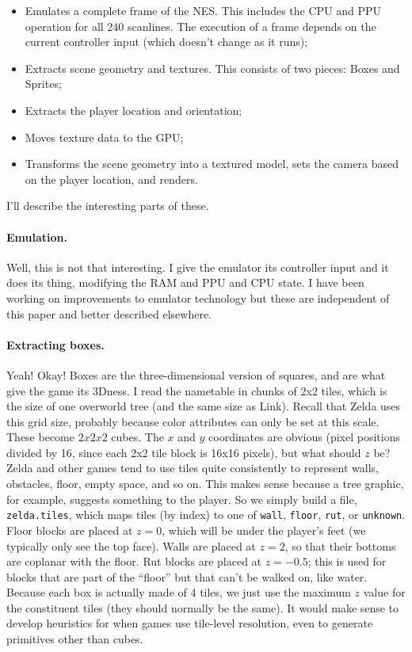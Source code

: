 \documentclass[twocolumn]{article}
\begin{document}
\begin{itemize}
\item Emulates a complete frame of the NES. This includes the CPU and
  PPU operation for all 240 scanlines. The execution of a frame depends
  on the current controller input (which doesn't change as it runs);
\item Extracts scene geometry and textures. This consists of two
  pieces: Boxes and Sprites;
\item Extracts the player location and orientation;
\item Moves texture data to the GPU;
\item Transforms the scene geometry into a textured model, sets the camera
  based on the player location, and renders.
\end{itemize}

I'll describe the interesting parts of these.

\paragraph{Emulation.} 
Well, this is not that interesting. I give the emulator its controller
input and it does its thing, modifying the RAM and PPU and CPU state.
I have been working on improvements to emulator technology but these
are independent of this paper and better described elsewhere.

\paragraph{Extracting boxes.} 
Yeah! Okay! Boxes are the three-dimensional version of squares, and
are what give the game its 3Dness. I read the nametable in chunks of
2x2 tiles, which is the size of one overworld tree (and the same size
as Link). Recall that Zelda uses this grid size, probably because
color attributes can only be set at this scale. These become $2x2x2$
cubes. The $x$ and $y$ coordinates are obvious (pixel positions
divided by 16, since each 2x2 tile block is 16x16 pixels), but what
should $z$ be? Zelda and other games tend to use tiles quite
consistently to represent walls, obstacles, floor, empty space, and so
on. This makes sense because a tree graphic, for example, suggests
something to the player. So we simply build a file,
\verb+zelda.tiles+, which maps tiles (by index) to one of \verb+wall+,
\verb+floor+, \verb+rut+, or \verb+unknown+. Floor blocks are placed
at $z=0$, which will be under the player's feet (we typically only see
the top face). Walls are placed at $z=2$, so that their bottoms are
coplanar with the floor. Rut blocks are placed at $z=-0.5$; this is
used for blocks that are part of the ``floor'' but that can't be
walked on, like water. Because each box is actually made of 4 tiles,
we just use the maximum $z$ value for the constituent tiles (they should
normally be the same). It would make sense to develop heuristics for
when games use tile-level resolution, even to generate primitives
other than cubes.
\end{document}
